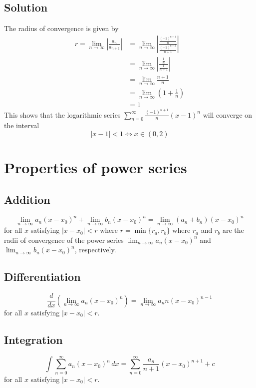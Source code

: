 \documentclass[11pt]{article}
\begin{document}
\subsection{Solution}
The radius of convergence is given by 
\begin{align*}
r = \lim_{n\rightarrow\infty} \left| \frac{a_n}{a_{n+1}} \right| &= \lim_{n\rightarrow\infty} \left| \frac{\frac{(-1)^{n+1}}{n}}{\frac{(-1)^{n+2}}{n+1}} \right| \\
&= \lim_{n\rightarrow\infty} \left| \frac{\frac{1}{n}}{\frac{1}{n+1}} \right| \\
&= \lim_{n\rightarrow\infty} \frac{n+1}{n} \\
&= \lim_{n\rightarrow\infty} \left( 1 + \frac{1}{n} \right) \\
&= 1
\end{align*}
This shows that the logarithmic series $\displaystyle{\sum_{n=0}^\infty \frac{(-1)^{n+1}}{n} (x-1)^n }$ will converge on the interval
\[ |x-1| < 1 \Leftrightarrow x \in (0, 2) \]

\section{Properties of power series}
\subsection{Addition}
\[ \lim_{n\rightarrow\infty} a_n (x-x_0)^n + \lim_{n\rightarrow\infty} b_n (x-x_0)^n  = \lim_{n\rightarrow\infty} (a_n + b_n) (x-x_0)^n\]
for all $x$ satisfying $|x-x_0| < r$ where $r = \min \{r_a, r_b\}$ where $r_a$ and $r_b$ are the radii of convergence of the power series $\displaystyle{\lim_{n\rightarrow\infty} a_n (x-x_0)^n}$ and $\displaystyle{\lim_{n\rightarrow\infty} b_n (x-x_0)^n}$, respectively.

\subsection{Differentiation}
\[ \frac{d}{dx} \left( \lim_{n\rightarrow\infty} a_n(x-x_0)^n \right) = \lim_{n\rightarrow\infty} a_n n (x-x_0)^{n-1} \]
for all $x$ satisfying $|x-x_0| < r$.

\subsection{Integration}
\[ \int \sum_{n=0}^\infty a_n (x-x_0)^n\, dx = \sum_{n=0}^\infty \frac{a_n}{n+1} (x-x_0)^{n+1} + c \]
for all $x$ satisfying $|x-x_0| < r$.
 
\end{document}
